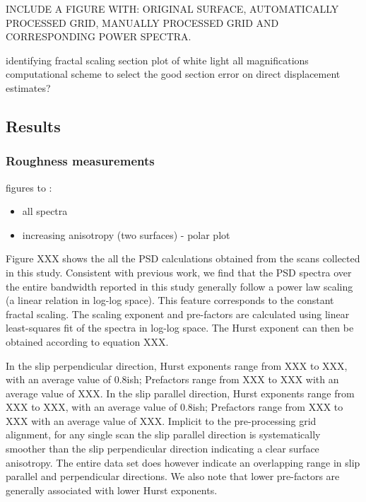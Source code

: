 \documentclass[12pt,a4paper]{article}
\begin{document}
INCLUDE A FIGURE WITH: ORIGINAL SURFACE, AUTOMATICALLY PROCESSED GRID, MANUALLY PROCESSED GRID AND CORRESPONDING POWER SPECTRA.


identifying fractal scaling section
	plot of white light all magnifications
	computational scheme to select the good section
error on direct displacement estimates?

\subsection{Results}

	
\subsubsection{Roughness measurements}

figures to :
\begin{itemize}
\item all spectra
\item increasing anisotropy (two surfaces) - polar plot

\end{itemize}

Figure XXX shows the all the PSD calculations obtained from the scans collected in this study. Consistent with previous work, we find that the PSD spectra over the entire bandwidth reported in this study generally follow a power law scaling (a linear relation in log-log space). This feature corresponds to the constant fractal scaling. The scaling exponent and pre-factors are calculated using linear least-squares fit of the spectra in log-log space. The Hurst exponent can then be obtained according to equation XXX.

In the slip perpendicular direction, Hurst exponents range from XXX to XXX, with an average value of 0.8ish; Prefactors range from  XXX to XXX with an average value of XXX. In the slip parallel direction, Hurst exponents range from XXX to XXX, with an average value of 0.8ish; Prefactors range from  XXX to XXX with an average value of XXX. Implicit to the pre-processing grid alignment, for any single scan the slip parallel direction is systematically smoother than the slip perpendicular direction indicating a clear surface anisotropy. The entire data set does however indicate an overlapping range in slip parallel and perpendicular directions. We also note that lower pre-factors are generally associated with lower Hurst exponents.
\end{document}
